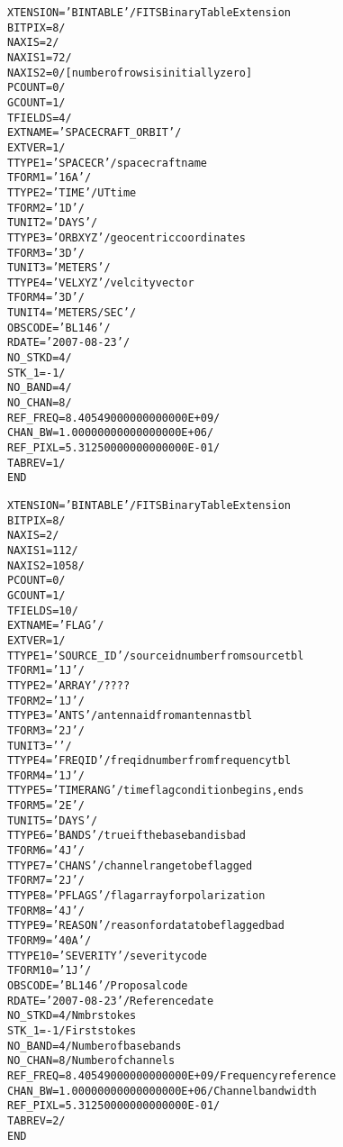 \documentclass[twoside]{article}
\begin{document}
\begin{alltt}
XTENSION= 'BINTABLE'           / FITS Binary Table Extension
BITPIX  =                    8 /
NAXIS   =                    2 /
NAXIS1  =                   72 /
NAXIS2  =                    0 / [number of rows is initially zero]
PCOUNT  =                    0 /
GCOUNT  =                    1 /
TFIELDS =                    4 /
EXTNAME = 'SPACECRAFT_ORBIT'   /
EXTVER  =                    1 /
TTYPE1  = 'SPACECR '           / spacecraft name
TFORM1  = '16A     '           /
TTYPE2  = 'TIME    '           / UT time
TFORM2  = '1D      '           /
TUNIT2  = 'DAYS    '           /
TTYPE3  = 'ORBXYZ  '           / geocentric coordinates
TFORM3  = '3D      '           /
TUNIT3  = 'METERS  '           /
TTYPE4  = 'VELXYZ  '           / velcity vector
TFORM4  = '3D      '           /
TUNIT4  = 'METERS/SEC'         /
OBSCODE = 'BL146   '           /
RDATE   = '2007-08-23'         /
NO_STKD =                    4 /
STK_1   =                   -1 /
NO_BAND =                    4 /
NO_CHAN =                    8 /
REF_FREQ=   8.40549000000000000E+09 /
CHAN_BW =   1.00000000000000000E+06 /
REF_PIXL=   5.31250000000000000E-01 /
TABREV  =                    1 /
END
\end{alltt}

\begin{alltt}
XTENSION= 'BINTABLE'           / FITS Binary Table Extension
BITPIX  =                    8 /
NAXIS   =                    2 /
NAXIS1  =                  112 /
NAXIS2  =                 1058 /
PCOUNT  =                    0 /
GCOUNT  =                    1 /
TFIELDS =                   10 /
EXTNAME = 'FLAG    '           /
EXTVER  =                    1 /
TTYPE1  = 'SOURCE_ID'          / source id number from source tbl
TFORM1  = '1J      '           /
TTYPE2  = 'ARRAY   '           / ????
TFORM2  = '1J      '           /
TTYPE3  = 'ANTS    '           / antenna id from antennas tbl
TFORM3  = '2J      '           /
TUNIT3  = '        '           /
TTYPE4  = 'FREQID  '           / freq id number from frequency tbl
TFORM4  = '1J      '           /
TTYPE5  = 'TIMERANG'           / time flag condition begins, ends
TFORM5  = '2E      '           /
TUNIT5  = 'DAYS    '           /
TTYPE6  = 'BANDS   '           / true if the baseband is bad
TFORM6  = '4J      '           /
TTYPE7  = 'CHANS   '           / channel range to be flagged
TFORM7  = '2J      '           /
TTYPE8  = 'PFLAGS  '           / flag array for polarization
TFORM8  = '4J      '           /
TTYPE9  = 'REASON  '           / reason for data to be flagged bad
TFORM9  = '40A     '           /
TTYPE10 = 'SEVERITY'           / severity code
TFORM10 = '1J      '           /
OBSCODE = 'BL146   '           / Proposal code
RDATE   = '2007-08-23'         / Reference date
NO_STKD =                    4 / Nmbr stokes
STK_1   =                   -1 / First stokes
NO_BAND =                    4 / Number of basebands
NO_CHAN =                    8 / Number of channels
REF_FREQ=   8.40549000000000000E+09 / Frequency reference
CHAN_BW =   1.00000000000000000E+06 / Channel bandwidth
REF_PIXL=   5.31250000000000000E-01 /
TABREV  =                    2 /
END
\end{alltt}
\end{document}
